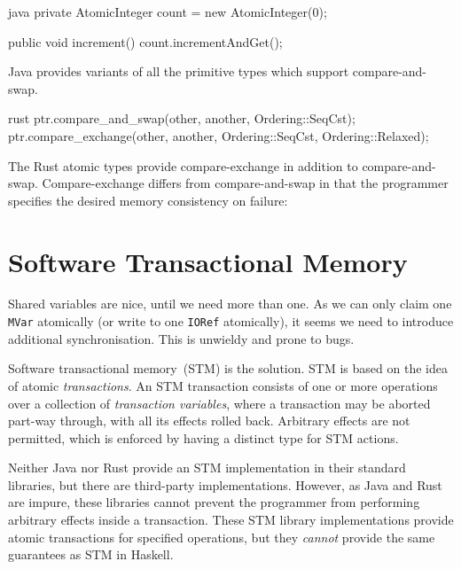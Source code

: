 \begin{listing}
\centering
\begin{cminted}{java}
private AtomicInteger count = new AtomicInteger(0);

public void increment() {
  count.incrementAndGet();
}
\end{cminted}
\caption{Compare-and-swap in Java}\label{lst:cas_java}
\end{listing}

Java provides variants of all the primitive types which support
compare-and-swap.

\begin{listing}
\centering
\begin{cminted}{rust}
ptr.compare_and_swap(other, another, Ordering::SeqCst);
ptr.compare_exchange(other, another, Ordering::SeqCst, Ordering::Relaxed);
\end{cminted}
\caption{Compare-and-swap in Rust.}\label{lst:cas_rust}
\end{listing}

The Rust atomic types provide compare-exchange in addition to
compare-and-swap.  Compare-exchange differs from compare-and-swap in
that the programmer specifies the desired memory consistency on
failure:

\section{Software Transactional Memory}
\label{sec:concurrent_haskell-stm}

Shared variables are nice, until we need more than one.  As we can
only claim one \verb|MVar| atomically (or write to one \verb|IORef|
atomically), it seems we need to introduce additional synchronisation.
This is unwieldy and prone to bugs.

Software transactional memory~(STM) is the solution.  STM is based on
the idea of atomic \emph{transactions}.  An STM transaction consists
of one or more operations over a collection of \emph{transaction
  variables}, where a transaction may be aborted part-way through,
with all its effects rolled back.  Arbitrary effects are not
permitted, which is enforced by having a distinct type for STM
actions.

Neither Java nor Rust provide an STM implementation in their standard
libraries, but there are third-party implementations.  However, as
Java and Rust are impure, these libraries cannot prevent the
programmer from performing arbitrary effects inside a transaction.
These STM library implementations provide atomic transactions for
specified operations, but they \emph{cannot} provide the same
guarantees as STM in Haskell.

